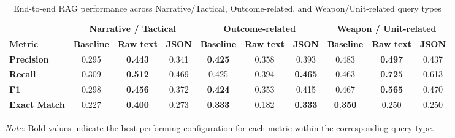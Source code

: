 \begin{table}[H]
    \centering
    \caption{End-to-end RAG performance across Narrative/Tactical, Outcome-related, and Weapon/Unit-related query types}
    \label{tab:e2e_query_types_2}

    \scriptsize
    \renewcommand{\arraystretch}{1.4}
    \setlength{\tabcolsep}{3pt}

    \begin{tabular}{l ccc ccc ccc}
        \toprule
        & \multicolumn{3}{c}{\textbf{Narrative / Tactical}}
        & \multicolumn{3}{c}{\textbf{Outcome-related}}
        & \multicolumn{3}{c}{\textbf{Weapon / Unit-related}} \\
        \cmidrule(lr){2-4}
        \cmidrule(lr){5-7}
        \cmidrule(lr){8-10}

        \textbf{Metric} &
        \textbf{Baseline} & \textbf{Raw text} & \textbf{JSON} &
        \textbf{Baseline} & \textbf{Raw text} & \textbf{JSON} &
        \textbf{Baseline} & \textbf{Raw text} & \textbf{JSON} \\
        \midrule

        \textbf{Precision} &
        0.295 & \textbf{0.443} & 0.341 &
        \textbf{0.425} & 0.358 & 0.393 &
        0.483 & \textbf{0.497} & 0.437 \\

        \textbf{Recall} &
        0.309 & \textbf{0.512} & 0.469 &
        0.425 & 0.394 & \textbf{0.465} &
        0.463 & \textbf{0.725} & 0.613 \\

        \textbf{F1} &
        0.298 & \textbf{0.456} & 0.372 &
        \textbf{0.424} & 0.353 & 0.415 &
        0.467 & \textbf{0.565} & 0.470 \\

        \textbf{Exact Match} &
        0.227 & \textbf{0.400} & 0.273 &
        \textbf{0.333} & 0.182 & \textbf{0.333} &
        \textbf{0.350} & 0.250 & 0.250 \\

        \bottomrule
    \end{tabular}

    \par\vspace{4pt}
    \begin{minipage}{\linewidth}
        \footnotesize
        \textit{Note:} Bold values indicate the best-performing
        configuration for each metric within the corresponding
        query type.
    \end{minipage}

\end{table}
